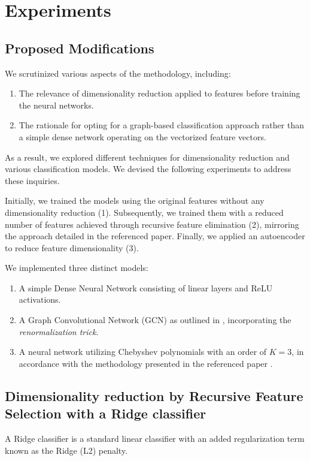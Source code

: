 \section{Experiments}

\subsection{Proposed Modifications}
We scrutinized various aspects of the methodology, including:
\begin{enumerate}
    \item The relevance of dimensionality reduction applied to features before training the neural networks.
    \item The rationale for opting for a graph-based classification approach rather than a simple dense network operating on the vectorized feature vectors.
\end{enumerate}
As a result, we explored different techniques for dimensionality reduction and various classification models. We devised the following experiments to address these inquiries.

Initially, we trained the models using the original features without any dimensionality reduction (1). Subsequently, we trained them with a reduced number of features achieved through recursive feature elimination (2), mirroring the approach detailed in the referenced paper. Finally, we applied an autoencoder to reduce feature dimensionality (3).

We implemented three distinct models:
\begin{enumerate}
    \item A simple Dense Neural Network consisting of linear layers and ReLU activations.
    \item A Graph Convolutional Network (GCN) as outlined in \cite{kipf_semi-supervised_2017}, incorporating the \textit{renormalization trick}.
    \item A neural network utilizing Chebyshev polynomials with an order of $K=3$, in accordance with the methodology presented in the referenced paper \cite{Parisot17}.
\end{enumerate}


\subsection{Dimensionality reduction by Recursive Feature Selection with a Ridge classifier}

A Ridge classifier is a standard linear classifier with an added regularization term known as the Ridge (L2) penalty.

